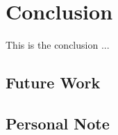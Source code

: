\chapter{Conclusion}

\label{Chapter9_conclusion} 

\begin{comment}
-------------------------------------------------
9. Conclusion
	a. Future Work
		i. Scoring Functions Improvement
		ii. Other Improvements (UI, distribution, change of framework. electron ui -> web based. )
	b. Personal Note
-------------------------------------------------
\end{comment}

This is the conclusion ...

\section{Future Work}
\begin{comment}

	-angle, dont die if left/right. 
	-need to have a way of returning 0 if one of the fingers is compeletley off. 
	-need to be able to parameterize by finger level. (compare2). if in gesture10 we expect the pinky to be a little curved, should be able to set that parameter on that pinky in that gesture. rather than entire algorithm. need more fine tune parameterization. 
\end{comment}




\section{Personal Note}
\begin{comment}

using goals is very helpful. 
break down of tasks. 

functional programming is so much better. 

learning things on the run. stackoverflow. learning to debug.

github. branches. going back in history. 
 
latex. 







\end{comment}